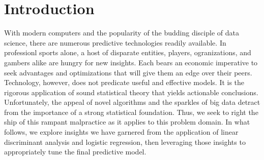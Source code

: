 \chapter{Introduction}\label{chap:introduction}
With modern computers and the popularity of the budding disciple of data science, there are numerous predictive technologies readily available.  In professionl sports alone, a host of disparate entities, players, ogranizations, and gambers alike are hungry for new insights. Each bears an economic imperative to seek advantages and optimizations that will give them an edge over their peers.  Technology, however, does not predicate useful and effective models.  It is the rigorous application of sound statistical theory that yields actionable conclusions.  Unfortunately, the appeal of novel algorithms and the sparkles of big data detract from the importance of a strong statistical foundation.  Thus, we seek to right the ship of this rampant malpractice as it applies to this problem domain.  In what follows, we explore insights we have garnered from the application of linear discriminant analysis and logistic regression, then leveraging those insights to appropriately tune the final predictive model.


